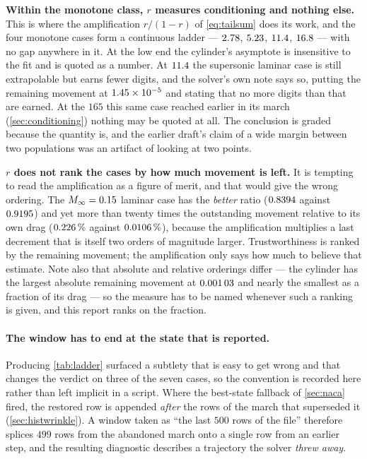 \textbf{Within the monotone class, $r$ measures conditioning and nothing else.} This is where
the amplification $r/(1-r)$ of \cref{eq:tailsum} does its work, and the four monotone cases
form a continuous ladder --- $\num{2.78}$, $\num{5.23}$,
$\num{11.4}$, $\num{16.8}$ --- with no gap anywhere in it. At the low
end the cylinder's asymptote is insensitive to the fit and is quoted as a number. At
$\num{11.4}$ the supersonic laminar case is still extrapolable but earns fewer
digits, and the solver's own note says so, putting the remaining movement at
$\num{1.45e-05}$ and stating that no more digits than that are earned. At the
$165$ this same case reached earlier in its march (\cref{sec:conditioning}) nothing may be
quoted at all. The conclusion is graded because the quantity is, and the earlier draft's
claim of a wide margin between two populations was an artifact of looking at two points.

\textbf{$r$ does not rank the cases by how much movement is left.} It is tempting to read
the amplification as a figure of merit, and that would give the wrong ordering. The
$M_\infty=0.15$ laminar case has the \emph{better} ratio
($\num{0.8394}$ against $\num{0.9195}$) and yet more than twenty times
the outstanding movement relative to its own drag ($\num{0.226}\,\%$
against $\num{0.0106}\,\%$), because the amplification multiplies a last
decrement that is itself two orders of magnitude larger. Trustworthiness is ranked by the
remaining movement; the amplification only says how much to believe that estimate. Note also
that absolute and relative orderings differ --- the cylinder has the largest absolute
remaining movement at $\num{0.00103}$ and nearly the smallest as a fraction of
its drag --- so the measure has to be named whenever such a ranking is given, and this report
ranks on the fraction.

\paragraph{The window has to end at the state that is reported.} Producing
\cref{tab:ladder} surfaced a subtlety that is easy to get wrong and that changes the verdict
on three of the seven cases, so the convention is recorded here rather than left implicit in a
script. Where the best-state fallback of \cref{sec:naca} fired, the restored row is appended
\emph{after} the rows of the march that superseded it (\cref{sec:histwrinkle}). A window
taken as ``the last $500$ rows of the file'' therefore splices $499$ rows from the abandoned
march onto a single row from an earlier step, and the resulting diagnostic describes a
trajectory the solver \emph{threw away}.

